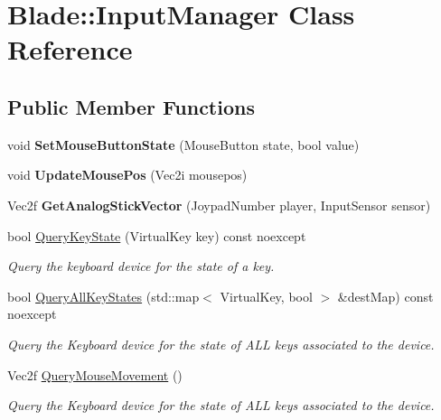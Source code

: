 \hypertarget{class_blade_1_1_input_manager}{}\section{Blade\+:\+:Input\+Manager Class Reference}
\label{class_blade_1_1_input_manager}
\subsection*{Public Member Functions}
\begin{DoxyCompactItemize}
\item 
\mbox{\label{class_blade_1_1_input_manager_a4670405f916ccabf83465154f3649d17}} 
void {\bfseries Set\+Mouse\+Button\+State} (Mouse\+Button state, bool value)
\item 
\mbox{\label{class_blade_1_1_input_manager_a61209430d6682ade700cc9fa89c7f50e}} 
void {\bfseries Update\+Mouse\+Pos} (Vec2i mousepos)
\item 
\mbox{\label{class_blade_1_1_input_manager_a97307f47638f62a6c9736675a6906f14}} 
Vec2f {\bfseries Get\+Analog\+Stick\+Vector} (Joypad\+Number player, Input\+Sensor sensor)
\item 
bool \hyperlink{class_blade_1_1_input_manager_a8d8e424cb1de012c830296a0812ceebc}{Query\+Key\+State} (Virtual\+Key key) const noexcept
\begin{DoxyCompactList}\small\item\em Query the keyboard device for the state of a key. \end{DoxyCompactList}\item 
bool \hyperlink{class_blade_1_1_input_manager_a6223ce5641fedc88d8e8591deb73ac90}{Query\+All\+Key\+States} (std\+::map$<$ Virtual\+Key, bool $>$ \&dest\+Map) const noexcept
\begin{DoxyCompactList}\small\item\em Query the Keyboard device for the state of A\+LL keys associated to the device. \end{DoxyCompactList}\item 
Vec2f \hyperlink{class_blade_1_1_input_manager_ab1fe795118afeb4642342567d3e27b3f}{Query\+Mouse\+Movement} ()
\begin{DoxyCompactList}\small\item\em Query the Keyboard device for the state of A\+LL keys associated to the device. \end{DoxyCompactList}\item 

\end{DoxyCompactItemize}

